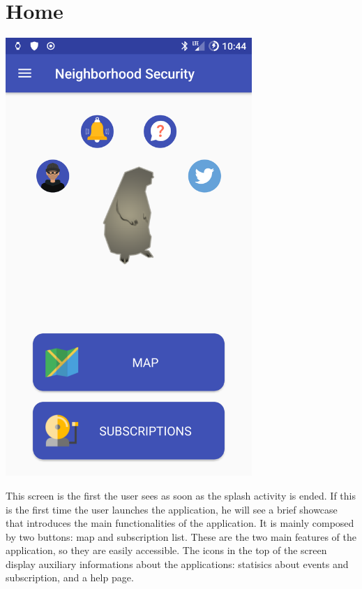 \documentclass[a4paper]{scrreprt}
\begin{document}
\section{Home}
\begin{minipage}{0.5\textwidth}
	\centering
	\includegraphics[width=0.7\textwidth]{imgs/home}
\end{minipage}
\begin{minipage}{0.5\textwidth}
	This screen is the first the user sees as soon as the splash activity is ended. If this is the first time the user launches the application, he will see a brief showcase that introduces the main functionalities of the application. It is mainly composed by two buttons: map and subscription list. These are the two main features of the application, so they are easily accessible. The icons in the top of the screen display auxiliary informations about the applications: statisics about events and subscription, and a help page.
\end{minipage}
\end{document}
